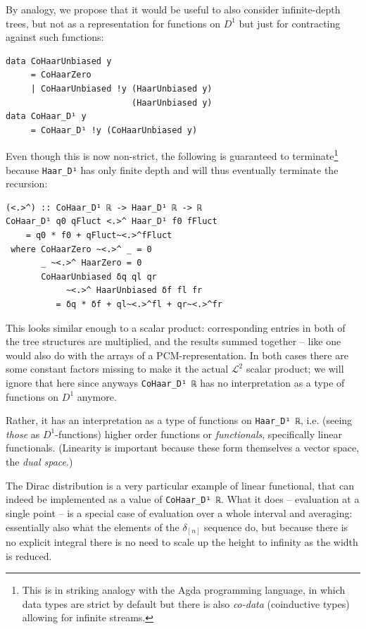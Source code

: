 \documentclass[final,sigplan]{acmart}\settopmatter{printfolios=true,printccs=false,printacmref=false}
\theoremstyle{acmplain}
\theoremstyle{acmdefinition}
\begin{document}
By analogy, we propose that it would be useful to also consider infinite-depth trees, but not as a representation for functions on $D^1$ but just for contracting against such functions:
\begin{lstlisting}
data CoHaarUnbiased y
     = CoHaarZero
     | CoHaarUnbiased !y (HaarUnbiased y)
                         (HaarUnbiased y)
data CoHaar_D¹ y
     = CoHaar_D¹ !y (CoHaarUnbiased y)
\end{lstlisting}
Even though this is now non-strict, the following is guaranteed to terminate\footnote{%
This is in striking analogy with the Agda programming language, in which data types are strict by default but there is also \emph{co-data} (coinductive types) allowing for infinite streams.
} because \verb`Haar_D¹` has only finite depth and will thus eventually terminate the recursion:
\begin{lstlisting}
(<.>^) :: CoHaar_D¹ ℝ -> Haar_D¹ ℝ -> ℝ
CoHaar_D¹ q0 qFluct <.>^ Haar_D¹ f0 fFluct
    = q0 * f0 + qFluct~<.>^fFluct
 where CoHaarZero ~<.>^ _ = 0
       _ ~<.>^ HaarZero = 0
       CoHaarUnbiased δq ql qr
            ~<.>^ HaarUnbiased δf fl fr
          = δq * δf + ql~<.>^fl + qr~<.>^fr
\end{lstlisting}
This looks similar enough to a scalar product: corresponding entries in both of the tree structures are multiplied, and the results summed together -- like one would also do with the arrays of a PCM-representation. In both cases there are some constant factors missing to make it the actual $\mathcal{L}^2$ scalar product; we will ignore that here since anyways \verb`CoHaar_D¹ ℝ` has no interpretation as a type of functions on $D^1$ anymore.

Rather, it has an interpretation as a type of functions on \verb`Haar_D¹ ℝ`, i.e. (seeing \emph{those} as $D^1$-functions) higher order functions or \emph{functionals}, specifically linear functionals. (Linearity is important because these form themselves a vector space, the \emph{dual space}.)

The Dirac distribution is a very particular example of linear functional, that can indeed be implemented as a value of \verb`CoHaar_D¹ ℝ`. What it does -- evaluation at a single point -- is a special case of evaluation over a whole interval and averaging: essentially also what the elements of the $\delta_{[n]}$ sequence do, but because there is no explicit integral there is no need to scale up the height to infinity as the width is reduced.
\end{document}
